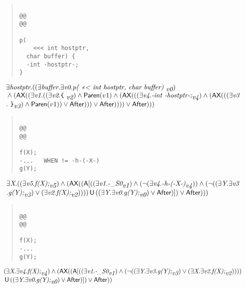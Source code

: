 \documentclass{article}
\newcommand{\U}{\,\mbox{\sf{U}}\,}
\newcommand{\A}{\mbox{\sf{A}}}
\newcommand{\AX}{\mbox{\sf{AX}}}
\newcommand{\mita}[1]{\mbox{\it{{#1}}}}
\newcommand{\msf}[1]{\mbox{\sf{{#1}}}}
\newcommand{\ttlb}{\mbox{\tt \char'173}}
\newcommand{\ttrb}{\mbox{\tt \char'175}}
\begin{document}
\begin{quote}\begin{verbatim}

@@
@@

p(
    <<< int hostptr, 
  char buffer) {
  -int -hostptr-;
}
\end{verbatim}\end{quote}

\[\begin{array}{l}
\exists \mita{hostptr} . ((\exists \mita{buffer} . \exists \mita{v0} . \mita{p(
    <<< int hostptr, 
  char buffer) }_{\mita{v0}})\\\mbox{} \wedge (\AX((\exists \mita{v1} . ((\exists \mita{v2} . \mita{{\ttlb}
  }_{\mita{v2}}) \wedge \msf{Paren}(v1) \wedge (\AX(((\exists \mita{v4} . \mita{-int -hostptr-;}_{\mita{v4}}) \wedge (\AX(((\exists \mita{v3}\\\mbox{} . \mita{
{\ttrb}}_{\mita{v3}}) \wedge \msf{Paren}(v1)) \vee \msf{After}))) \vee \msf{After})))) \vee \msf{After})))
\end{array}\]

\begin{quote}\begin{verbatim}

@@
@@

f(X);
-...   WHEN != -h-(-X-)
g(Y);
\end{verbatim}\end{quote}

\[\begin{array}{l}
\exists \mita{X} . ((\exists \mita{v5} . \mita{f(X);}_{\mita{v5}}) \wedge (\AX((\A[((\exists \mita{v1} . \mita{-\_S0}_{\mita{v1}}) \wedge (\neg (\exists \mita{v4} . \mita{-h-(-X-)}_{\mita{v4}})) \wedge (\neg ((\exists \mita{Y} . \exists \mita{v3}\\\mbox{} . \mita{g(Y);}_{\mita{v3}}) \vee (\exists \mita{v2} . \mita{f(X);}_{\mita{v2}})))) \U ((\exists \mita{Y} . \exists \mita{v0} . \mita{g(Y);}_{\mita{v0}}) \vee \msf{After})]
) \vee \msf{After})))
\end{array}\]

\begin{quote}\begin{verbatim}

@@
@@

f(X);
-...
g(Y);
\end{verbatim}\end{quote}

\[\begin{array}{l}
(\exists \mita{X} . \exists \mita{v4} . \mita{f(X);}_{\mita{v4}}) \wedge (\AX((\A[((\exists \mita{v1} . \mita{-\_S0}_{\mita{v1}}) \wedge (\neg ((\exists \mita{Y} . \exists \mita{v3} . \mita{g(Y);}_{\mita{v3}}) \vee (\exists \mita{X} . \exists \mita{v2} . \mita{f(X);}_{\mita{v2}}))))\\\mbox{} \U ((\exists \mita{Y} . \exists \mita{v0} . \mita{g(Y);}_{\mita{v0}}) \vee \msf{After})]
) \vee \msf{After}))
\end{array}\]
\end{document}
